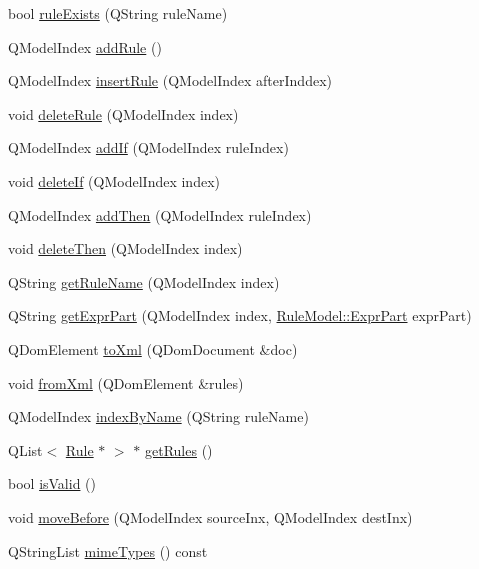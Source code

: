 \begin{DoxyCompactItemize}
\item 
bool \hyperlink{class_rule_model_a33b17156eeac9d685dbaf5835905ec33}{ruleExists} (QString ruleName)
\item 
QModelIndex \hyperlink{class_rule_model_aac2bf5aeb8aa45c2633ea98cf7ce5a42}{addRule} ()
\item 
QModelIndex \hyperlink{class_rule_model_a37c31c0ea2c63f0a41f6ceea25cd67f7}{insertRule} (QModelIndex afterInddex)
\item 
void \hyperlink{class_rule_model_a561002ec39461adcf932717a6dd299da}{deleteRule} (QModelIndex index)
\item 
QModelIndex \hyperlink{class_rule_model_ada9f0f96da069f0e19e7cf43188aa7b4}{addIf} (QModelIndex ruleIndex)
\item 
void \hyperlink{class_rule_model_acdf78d44f8e6a960295624a5885a6d33}{deleteIf} (QModelIndex index)
\item 
QModelIndex \hyperlink{class_rule_model_a3e1fa18cfb0fdbf23b4854c19b3f4532}{addThen} (QModelIndex ruleIndex)
\item 
void \hyperlink{class_rule_model_a3141590409f36b6aff172adfe2ea5395}{deleteThen} (QModelIndex index)
\item 
QString \hyperlink{class_rule_model_ae1ff29d7064baac4d1513b5ecde12577}{getRuleName} (QModelIndex index)
\item 
QString \hyperlink{class_rule_model_a50bf4e7ad8aa7f82f1ad730a549c42c9}{getExprPart} (QModelIndex index, \hyperlink{class_rule_model_a1010ef4729cc70469ab2a51416b32716}{RuleModel::ExprPart} exprPart)
\item 
QDomElement \hyperlink{class_rule_model_a9048ce06933aefd4a1353228db069c61}{toXml} (QDomDocument \&doc)
\item 
void \hyperlink{class_rule_model_a63f56e19be4afdf322958837193b7891}{fromXml} (QDomElement \&rules)
\item 
QModelIndex \hyperlink{class_rule_model_a5064e0aecac4a12fea106353e277525c}{indexByName} (QString ruleName)
\item 
QList$<$ \hyperlink{class_rule}{Rule} $\ast$ $>$ $\ast$ \hyperlink{class_rule_model_a993492ee641bec8db97da7e2e7c0e28e}{getRules} ()
\item 
bool \hyperlink{class_rule_model_afa7c3b765c852ada4273d58c73fcf2dd}{isValid} ()
\item 
void \hyperlink{class_rule_model_a73b8d90c8ad39fde6430fd521c47d67f}{moveBefore} (QModelIndex sourceInx, QModelIndex destInx)
\item 
QStringList \hyperlink{class_rule_model_a64f42e943ee15f0bab3629b77e75cfbc}{mimeTypes} () const 

\end{DoxyCompactItemize}
